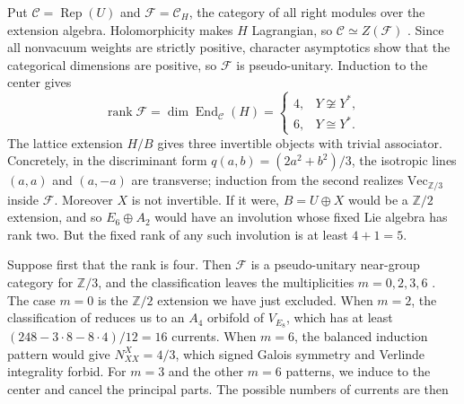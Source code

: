 \documentclass[11pt,a4paper]{article}
\DeclareMathOperator{\Rep}{Rep}
\DeclareMathOperator{\End}{End}
\newcommand{\ZZ}{\mathbb Z}
\begin{document}
Put $\mathcal C=\Rep(U)$ and $\mathcal F=\mathcal C_H$, the category
of all right modules over the extension algebra. Holomorphicity makes
$H$ Lagrangian, so $\mathcal C\simeq Z(\mathcal F)$ \cite{DMNO}.
Since all nonvacuum weights are strictly positive, character
asymptotics show that the categorical dimensions are positive, so
$\mathcal F$ is pseudo-unitary. Induction to the center gives
\begin{equation}\label{eq:rank}
 \operatorname{rank}\mathcal F=\dim\End_{\mathcal C}(H)
 =\begin{cases}4,&Y\not\cong Y^*,\\6,&Y\cong Y^*.
 \end{cases}
\end{equation}
The lattice extension $H/B$ gives three invertible objects with
trivial associator. Concretely, in the discriminant form
$q(a,b)=(2a^2+b^2)/3$, the isotropic lines $(a,a)$ and $(a,-a)$ are
transverse; induction from the second realizes $\mathrm{Vec}_{\ZZ/3}$ inside
$\mathcal F$. Moreover $X$ is not invertible. If it were, $B=U\oplus X$
would be a $\ZZ/2$ extension, and so $E_6\oplus A_2$ would have an
involution whose fixed Lie algebra has rank two. But the fixed rank of
any such involution is at least $4+1=5$.


Suppose first that the rank is four. Then $\mathcal F$ is a
pseudo-unitary near-group category for $\ZZ/3$, and the classification
leaves the multiplicities $m=0,2,3,6$ \cite{Larson}. The case $m=0$ is
the $\ZZ/2$ extension we have just excluded.
When $m=2$, the classification
of \cite{EGO} reduces us to an $A_4$ orbifold of $V_{E_8}$, which has
at least
$(248-3\cdot8-8\cdot4)/12=16$ currents. When $m=6$, the balanced
induction pattern would give $N_{XX}^{X}=4/3$, which signed Galois
symmetry and Verlinde integrality forbid. For $m=3$ and the other
$m=6$ patterns, we induce to the center and cancel the principal
parts. The possible numbers of currents are then
\end{document}

